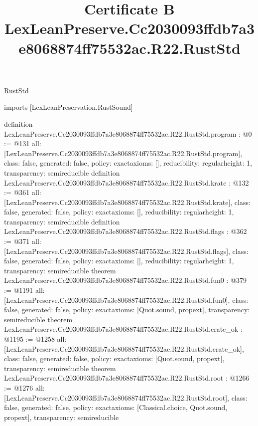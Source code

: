 \begin{lexlean}{RustStd}
\title{Certificate B LexLeanPreserve.Cc2030093ffdb7a3e8068874ff75532ac.R22.RustStd}
\begin{coremodule}
imports [LexLeanPreservation.RustSound]

definition LexLeanPreserve.Cc2030093ffdb7a3e8068874ff75532ac.R22.RustStd.program : @0 := @131 {
  all: [LexLeanPreserve.Cc2030093ffdb7a3e8068874ff75532ac.R22.RustStd.program],
  class: false,
  generated: false,
  policy: exact{axioms: []},
  reducibility: regular{height: 1},
  transparency: semireducible
}
definition LexLeanPreserve.Cc2030093ffdb7a3e8068874ff75532ac.R22.RustStd.krate : @132 := @361 {
  all: [LexLeanPreserve.Cc2030093ffdb7a3e8068874ff75532ac.R22.RustStd.krate],
  class: false,
  generated: false,
  policy: exact{axioms: []},
  reducibility: regular{height: 1},
  transparency: semireducible
}
definition LexLeanPreserve.Cc2030093ffdb7a3e8068874ff75532ac.R22.RustStd.flags : @362 := @371 {
  all: [LexLeanPreserve.Cc2030093ffdb7a3e8068874ff75532ac.R22.RustStd.flags],
  class: false,
  generated: false,
  policy: exact{axioms: []},
  reducibility: regular{height: 1},
  transparency: semireducible
}
theorem LexLeanPreserve.Cc2030093ffdb7a3e8068874ff75532ac.R22.RustStd.fun0 : @379 := @1191 {
  all: [LexLeanPreserve.Cc2030093ffdb7a3e8068874ff75532ac.R22.RustStd.fun0],
  class: false,
  generated: false,
  policy: exact{axioms: [Quot.sound, propext]},
  transparency: semireducible
}
theorem LexLeanPreserve.Cc2030093ffdb7a3e8068874ff75532ac.R22.RustStd.crate_ok : @1195 := @1258 {
  all: [LexLeanPreserve.Cc2030093ffdb7a3e8068874ff75532ac.R22.RustStd.crate_ok],
  class: false,
  generated: false,
  policy: exact{axioms: [Quot.sound, propext]},
  transparency: semireducible
}
theorem LexLeanPreserve.Cc2030093ffdb7a3e8068874ff75532ac.R22.RustStd.root : @1266 := @1276 {
  all: [LexLeanPreserve.Cc2030093ffdb7a3e8068874ff75532ac.R22.RustStd.root],
  class: false,
  generated: false,
  policy: exact{axioms: [Classical.choice, Quot.sound, propext]},
  transparency: semireducible
}


\end{coremodule}
\end{lexlean}
